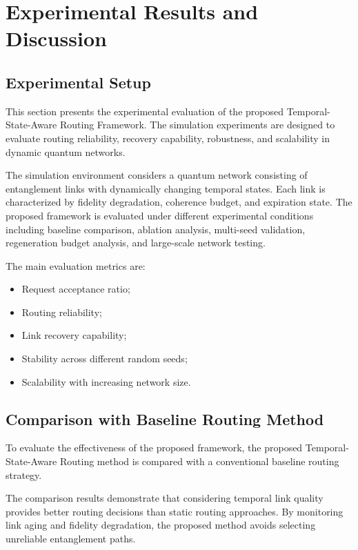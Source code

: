 \chapter{Experimental Results and Discussion}

\section{Experimental Setup}

This section presents the experimental evaluation of the proposed
Temporal-State-Aware Routing Framework. The simulation experiments are
designed to evaluate routing reliability, recovery capability, robustness,
and scalability in dynamic quantum networks.

The simulation environment considers a quantum network consisting of
entanglement links with dynamically changing temporal states. Each link
is characterized by fidelity degradation, coherence budget, and expiration
state. The proposed framework is evaluated under different experimental
conditions including baseline comparison, ablation analysis, multi-seed
validation, regeneration budget analysis, and large-scale network testing.

The main evaluation metrics are:

\begin{itemize}
    \item Request acceptance ratio;
    \item Routing reliability;
    \item Link recovery capability;
    \item Stability across different random seeds;
    \item Scalability with increasing network size.
\end{itemize}


\section{Comparison with Baseline Routing Method}

To evaluate the effectiveness of the proposed framework, the proposed
Temporal-State-Aware Routing method is compared with a conventional
baseline routing strategy.

The comparison results demonstrate that considering temporal link quality
provides better routing decisions than static routing approaches. By
monitoring link aging and fidelity degradation, the proposed method avoids
selecting unreliable entanglement paths.

